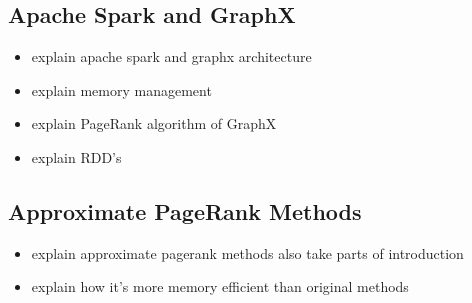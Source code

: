 \subsection{Apache Spark and GraphX}
\begin{itemize}
    \item explain apache spark and graphx architecture
    \item explain memory management
    \item explain PageRank algorithm of GraphX
    \item explain RDD's
\end{itemize}

\subsection{Approximate PageRank Methods}
\begin{itemize}
    \item explain approximate pagerank methods also take parts of introduction
    \item explain how it's more memory efficient than original methods
\end{itemize}